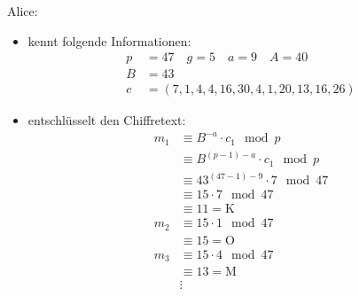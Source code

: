 \documentclass[
  a4paper,
  11pt,
]{article}
\begin{document}
\begin{itemize}
    Alice:
    \begin{itemize}
      \item kennt folgende Informationen:
        \begin{align*}
          p & = 47 \quad g = 5 \quad a = 9 \quad A = 40\\
          B & = 43\\
          c & = (7, 1, 4, 4, 16, 30, 4, 1, 20, 13, 16, 26)
        \end{align*}
      \item entschlüsselt den Chiffretext:
        \begin{align*}
          m_1 & \equiv B^{-a} \cdot c_1 \mod p\\
              & \equiv B^{(p-1)-a} \cdot c_1 \mod p\\
              & \equiv 43^{(47-1)-9} \cdot 7 \mod 47\\
              & \equiv 15 \cdot 7 \mod 47\\
              & \equiv 11 = \text{K}\\
          m_2 & \equiv 15 \cdot 1 \mod 47\\
              & \equiv 15 = \text{O}\\
          m_3 & \equiv 15 \cdot 4 \mod 47\\
              & \equiv 13 = \text{M}\\
              & \vdots
        \end{align*}
    \end{itemize}

\end{itemize}
\end{document}
